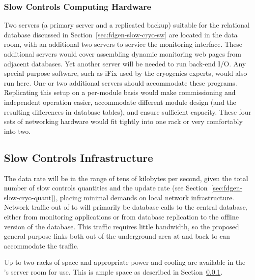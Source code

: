 \subsubsection{Slow Controls Computing Hardware}
\label{sec:fdgen-slow-cryo-slow-compute}
Two servers (a primary server and a replicated backup) suitable for the relational database discussed
in Section~\ref{sec:fdgen-slow-cryo-sw} are located in the  data
room, with an additional
two servers to service the  monitoring interface.  These additional servers would cover assembling dynamic  monitoring web pages from adjacent
databases. Yet another server will be needed to run back-end I/O.  Any special purpose software, such as iFix used by the cryogenics experts, would
also run here. One or two additional servers should accommodate these programs.
Replicating this setup on a per-module basis would make commissioning and independent operation easier, accommodate different module
design (and the resulting differences in database tables), and ensure
sufficient capacity.  These four sets of networking hardware would fit tightly into one rack or very comfortably into two. %




\subsection{Slow Controls Infrastructure}
\label{sec:fdgen-slow-cryo-slow-infra}

The data rate will be in the range of tens of kilobytes per second, given the total number of slow controls quantities and the update rate  
(see Section~\ref{sec:fdgen-slow-cryo-quant}), placing minimal demands
on local network infrastructure.
Network traffic out of  to  will primarily be database calls
to the central  database, either from monitoring applications or from
database replication to the offline version of the  database.  This
traffic requires little bandwidth, so the proposed general purpose
links both out of the %
underground area at   and back to  can accommodate the traffic.

Up to two racks of space and appropriate power and cooling are
available in the 's  server room for  use. This is ample space as described in Section~\ref{sec:fdgen-slow-cryo-slow-compute}.


